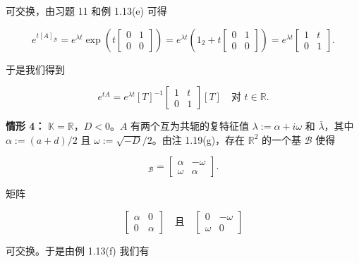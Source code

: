 \begin{remark}
\begin{items}
可交换，由习题 11 和例 1.13(e) 可得

\begin{equation*}
e^{t[A]_{\mathcal{B}}} = e^{\lambda t}\exp\left( t\begin{bmatrix} 0 & 1 \\ 0 & 0 \end{bmatrix} \right) = e^{\lambda t}\left( 1_{2} + t\begin{bmatrix} 0 & 1 \\ 0 & 0 \end{bmatrix} \right) = e^{\lambda t}\begin{bmatrix} 1 & t \\ 0 & 1 \end{bmatrix} .
\end{equation*}

于是我们得到

\begin{equation*}
e^{tA} = e^{\lambda t}[T]^{-1}\begin{bmatrix} 1 & t \\ 0 & 1 \end{bmatrix}[T] \quad \text{对 } t \in \mathbb{R} .
\end{equation*}

\textbf{情形 4：} $ \mathbb{K} = \mathbb{R} $，$ D < 0 $。$ A $ 有两个互为共轭的复特征值 $ \lambda := \alpha + i\omega $ 和 $ \bar{\lambda} $，其中 $ \alpha := (a + d)/2 $ 且 $ \omega := \sqrt{-D}/2 $。由注 1.19(g)，存在 $ \mathbb{R}^{2} $ 的一个基 $ \mathcal{B} $ 使得

\begin{equation*}
[A]_{\mathcal{B}} = \begin{bmatrix} \alpha & -\omega \\ \omega & \alpha \end{bmatrix} .
\end{equation*}

矩阵

\begin{equation*}
\begin{bmatrix} \alpha & 0 \\ 0 & \alpha \end{bmatrix} \quad \text{且} \quad \begin{bmatrix} 0 & -\omega \\ \omega & 0 \end{bmatrix}
\end{equation*}

可交换。于是由例 1.13(f) 我们有


\end{items}
\end{remark}
